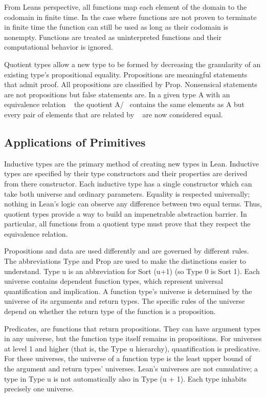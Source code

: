 \documentclass{article}
\newcommand{\1}{\mathbbm{1}}
\theoremstyle{plain}
\theoremstyle{definition}
\numberwithin{equation}{section}
\begin{document}
From Leans perspective, all functions map each element of the domain to the codomain in finite time. In the case where functions are not proven to terminate in finite time the function can still be used as long as their codomain is nonempty. Functions are treated as uninterpreted functions and their computational behavior is ignored. 

Quotient types allow a new type to be formed by decreasing the granularity of an existing type’s propositional equality. Propositions are meaningful statements that admit proof. All propositions are classified by Prop. Nonsensical statements are not propositions but false statements are. In a given type A with an equivalence relation ~ the quotient A/~ contains the same elements as A but every pair of elements that are related by ~ are now considered equal. 

\subsection{Applications of Primitives}

Inductive types are the primary method of creating new types in Lean. Inductive types are specified by their type constructors and their properties are derived from there constructor. Each inductive type has a single constructor which can take both universe and ordinary parameters. Equality is respected universally; nothing in Lean's logic can observe any difference between two equal terms. Thus, quotient types provide a way to build an impenetrable abstraction barrier. In particular, all functions from a quotient type must prove that they respect the equivalence relation.

Propositions and data are used differently and are governed by different rules. The abbreviations Type and Prop are used to make the distinctions easier to understand. Type u is an abbreviation for Sort (u+1) (so Type 0 is Sort 1). Each universe contains dependent function types, which represent universal quantification and implication. A function type’s universe is determined by the universe of its arguments and return types. The specific rules of the universe depend on whether the return type of the function is a proposition. 

Predicates, are functions that return propositions. They can have argument types in any universe, but the function type itself remains in propositions. For universes at level 1 and higher (that is, the Type u hierarchy), quantification is predicative. For these universes, the universe of a function type is the least upper bound of the argument and return types' universes. Lean's universes are not cumulative; a type in Type u is not automatically also in Type (u + 1). Each type inhabits precisely one universe.
\end{document}
